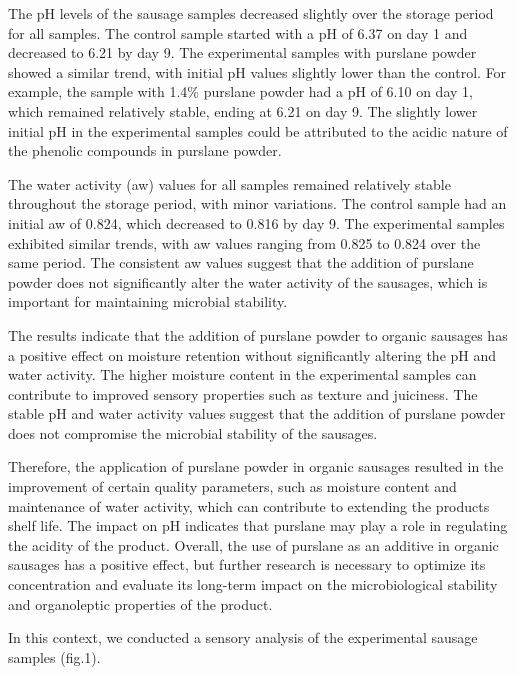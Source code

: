 \begin{multicols}{2}

The pH levels of the sausage samples decreased slightly over the storage
period for all samples. The control sample started with a pH of 6.37 on
day 1 and decreased to 6.21 by day 9. The experimental samples with
purslane powder showed a similar trend, with initial pH values slightly
lower than the control. For example, the sample with 1.4\% purslane
powder had a pH of 6.10 on day 1, which remained relatively stable,
ending at 6.21 on day 9. The slightly lower initial pH in the
experimental samples could be attributed to the acidic nature of the
phenolic compounds in purslane powder.

The water activity (aw) values for all samples remained relatively
stable throughout the storage period, with minor variations. The control
sample had an initial aw of 0.824, which decreased to 0.816 by day 9.
The experimental samples exhibited similar trends, with aw values
ranging from 0.825 to 0.824 over the same period. The consistent aw
values suggest that the addition of purslane powder does not
significantly alter the water activity of the sausages, which is
important for maintaining microbial stability.

The results indicate that the addition of purslane powder to organic
sausages has a positive effect on moisture retention without
significantly altering the pH and water activity. The higher moisture
content in the experimental samples can contribute to improved sensory
properties such as texture and juiciness. The stable pH and water
activity values suggest that the addition of purslane powder does not
compromise the microbial stability of the sausages.

Therefore, the application of purslane powder in organic sausages
resulted in the improvement of certain quality parameters, such as
moisture content and maintenance of water activity, which can contribute
to extending the product\textquotesingle s shelf life. The impact on pH
indicates that purslane may play a role in regulating the acidity of the
product. Overall, the use of purslane as an additive in organic sausages
has a positive effect, but further research is necessary to optimize its
concentration and evaluate its long-term impact on the microbiological
stability and organoleptic properties of the product.

In this context, we conducted a sensory analysis of the experimental
sausage samples (fig.1).
\end{multicols}

